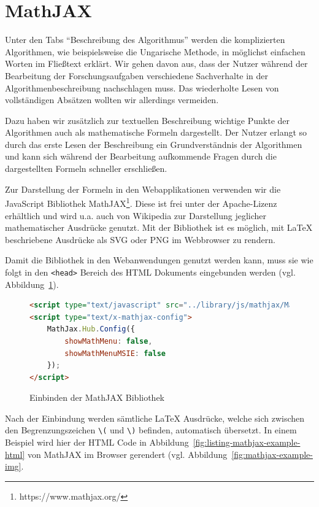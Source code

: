 \section{MathJAX} %
Unter den Tabs \enquote{Beschreibung des Algorithmus} werden die komplizierten Algorithmen, wie beispielsweise die Ungarische Methode, in möglichst einfachen Worten im Fließtext erklärt. Wir gehen davon aus, dass der Nutzer während der Bearbeitung der Forschungsaufgaben verschiedene Sachverhalte in der Algorithmenbeschreibung nachschlagen muss. Das wiederholte Lesen von vollständigen Absätzen wollten wir allerdings vermeiden.

Dazu haben wir zusätzlich zur textuellen Beschreibung wichtige Punkte der Algorithmen auch als mathematische Formeln dargestellt. Der Nutzer erlangt so durch das erste Lesen der Beschreibung ein Grundverständnis der Algorithmen und kann sich während der Bearbeitung aufkommende Fragen durch die dargestellten Formeln schneller erschließen.

Zur Darstellung der Formeln in den Webapplikationen verwenden wir die JavaScript Bibliothek MathJAX\footnote{https://www.mathjax.org/}. Diese ist frei unter der Apache-Lizenz erhältlich und wird u.a. auch von Wikipedia zur Darstellung jeglicher mathematischer Ausdrücke genutzt. Mit der Bibliothek ist es möglich, mit LaTeX beschriebene Ausdrücke als SVG oder PNG im Webbrowser zu rendern. 

Damit die Bibliothek in den Webanwendungen genutzt werden kann, muss sie wie folgt in den \texttt{<head>} Bereich des HTML Dokuments eingebunden werden (vgl. Abbildung~\ref{fig:listing-mathjax-include}).

\begin{figure}[h!]
\begin{lstlisting}[language=HTML]
<script type="text/javascript" src="../library/js/mathjax/MathJax.js?config=TeX-AMS-MML_SVG.js&locale=de"></script>
<script type="text/x-mathjax-config">
	MathJax.Hub.Config({
		showMathMenu: false,
		showMathMenuMSIE: false
	});
</script>
\end{lstlisting}
\caption[MathJAX: Einbindung]{Einbinden der MathJAX Bibliothek}\label{fig:listing-mathjax-include}
\end{figure}

Nach der Einbindung werden sämtliche LaTeX Ausdrücke, welche sich zwischen den Begrenzungszeichen \texttt{\textbackslash(} und \texttt{\textbackslash)} befinden, automatisch übersetzt. In einem Beispiel wird hier der HTML Code in Abbildung~\ref{fig:listing-mathjax-example-html} von MathJAX im Browser gerendert (vgl. Abbildung~\ref{fig:mathjax-example-img}.

